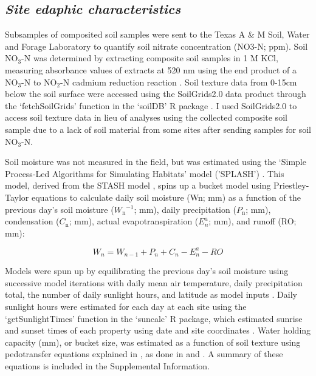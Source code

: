 \subsection{\textit{Site edaphic characteristics}}
\noindent Subsamples of composited soil samples were sent to the Texas A \& M Soil, Water and Forage Laboratory to quantify soil nitrate concentration (NO3-N; ppm). Soil NO$_{3}$-N was determined by extracting composite soil samples in 1 M KCl, measuring absorbance values of extracts at 520 nm using the end product of a NO$_{3}$-N to NO$_{2}$-N cadmium reduction reaction . Soil texture data from 0-15cm below the soil surface were accessed using the SoilGrids2.0 data product  through the ‘fetchSoilGrids’ function in the ‘soilDB’ R package . I used SoilGrids2.0 to access soil texture data in lieu of analyses using the collected composite soil sample due to a lack of soil material from some sites after sending samples for soil NO$_{3}$-N.

Soil moisture was not measured in the field, but was estimated using the ‘Simple Process-Led Algorithms for Simulating Habitats’ model ('SPLASH') . This model, derived from the STASH model , spins up a bucket model using Priestley-Taylor equations  to calculate daily soil moisture (Wn; mm) as a function of the previous day’s soil moisture ($W_\mathrm{n}{}^{-1}$; mm), daily precipitation ($P_\mathrm{n}$; mm), condensation ($C_\mathrm{n}$; mm), actual evapotranspiration ($E_{n}^a$; mm), and runoff (RO; mm):

\begin{equation}
    \label{eq_4.7}
    W_n = W_{n-1} + P_n + C_n - E_{n}^{a} - RO
\end{equation}

Models were spun up by equilibrating the previous day’s soil moisture using successive model iterations with daily mean air temperature, daily precipitation total, the number of daily sunlight hours, and latitude as model inputs . Daily sunlight hours were estimated for each day at each site using the ‘getSunlightTimes’ function in the ‘suncalc’ R package, which estimated sunrise and sunset times of each property using date and site coordinates . Water holding capacity (mm), or bucket size, was estimated as a function of soil texture using pedotransfer equations explained in , as done in  and . A summary of these equations is included in the Supplemental Information.

